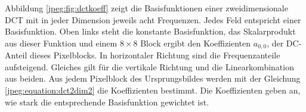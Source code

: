 Abbildung \ref{jpeg:fig:dctkoeff} zeigt die Basisfunktionen einer zweidimensionale DCT mit in jeder Dimen\-sion jeweils acht Frequenzen.
Jedes Feld entspricht einer Basisfunktion.
Oben links steht die konstante Basisfunktion, das Skalarprodukt aus dieser Funktion und einem \(8 \times 8\) Block ergibt den Koeffizienten \(a_{0,0}\), der DC-Anteil dieses Pixelblocks.
%
In horizontaler Richtung sind die Frequenzanteile aufsteigend.
Gleiches gilt für die vertikale Richtung und die Linearkombination aus beiden.
Aus jedem Pixelblock des Ursprungsbildes werden mit der Gleichung \eqref{jpeg:equation:dct2dim2} die Koeffizienten bestimmt.
Die Koeffizienten geben an, wie stark die entsprechende Basisfunktion gewichtet ist. 



